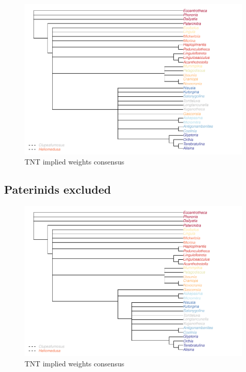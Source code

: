 \documentclass[]{book}
\theoremstyle{definition}
\theoremstyle{definition}
\theoremstyle{definition}
\theoremstyle{remark}
\begin{document}
\begin{figure}
\centering
\includegraphics{Brachiopod_phylogeny_files/figure-latex/unnamed-chunk-10-1.pdf}
\caption{\label{fig:unnamed-chunk-10}TNT implied weights consensus}
\end{figure}

\hypertarget{paterinids-excluded}{%
\subsection{Paterinids excluded}\label{paterinids-excluded}}

\begin{figure}
\centering
\includegraphics{Brachiopod_phylogeny_files/figure-latex/unnamed-chunk-11-1.pdf}
\caption{\label{fig:unnamed-chunk-11}TNT implied weights consensus}
\end{figure}
\end{document}
